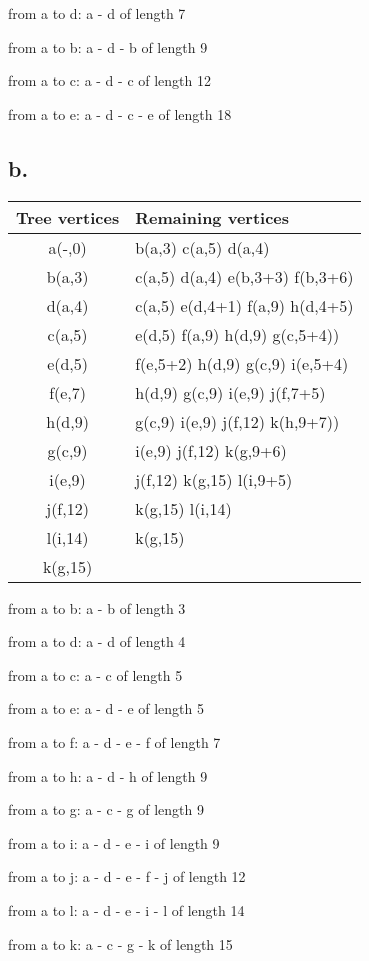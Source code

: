 \documentclass{article}
\begin{document}
from a to d: a - d of length 7

from a to b: a - d - b of length 9

from a to c: a - d - c of length 12

from a to e: a - d - c - e of length 18

\subsection*{b.}

\begin{center}
  \begin{tabular}{c l}
    \hline
    Tree vertices & Remaining vertices \\
    \hline
    a(-,0)& b(a,3) c(a,5) d(a,4)                \\
    b(a,3)& c(a,5) d(a,4) e(b,3+3) f(b,3+6)     \\
    d(a,4)& c(a,5) e(d,4+1) f(a,9) h(d,4+5)     \\
    c(a,5)& e(d,5) f(a,9) h(d,9) g(c,5+4))      \\
    e(d,5)& f(e,5+2) h(d,9) g(c,9) i(e,5+4)     \\
    f(e,7)& h(d,9) g(c,9) i(e,9) j(f,7+5)       \\
    h(d,9)& g(c,9) i(e,9) j(f,12) k(h,9+7))     \\
    g(c,9)& i(e,9) j(f,12) k(g,9+6)             \\
    i(e,9)& j(f,12) k(g,15) l(i,9+5)            \\
    j(f,12)& k(g,15) l(i,14)                    \\
    l(i,14)& k(g,15)                            \\
    k(g,15)&                                    \\
    \hline
  \end{tabular}
\end{center}

from a to b: a - b of length 3

from a to d: a - d of length 4

from a to c: a - c of length 5

from a to e: a - d - e of length 5

from a to f: a - d - e - f of length 7

from a to h: a - d - h of length 9

from a to g: a - c - g of length 9

from a to i: a - d - e - i of length 9

from a to j: a - d - e - f - j of length 12

from a to l: a - d - e - i - l of length 14

from a to k: a - c - g - k of length 15
\end{document}
